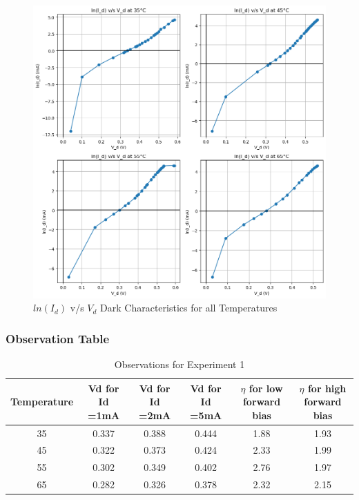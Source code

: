 \documentclass[a4paper]{article}
\begin{document}
\newpage

\begin{figure}[h!]
    \centering
    \includegraphics[width=1\linewidth]{Lab_5/Post_Lab/ln_I_d_vs_V_d_Exp_1_Summarised.png}
    \caption{$ln(I_d)$ v/s $V_d$ Dark Characteristics for all Temperatures}
\end{figure}

\subsubsection{Observation Table}
\begin{table}[!h]
    \centering
    \begin{tabular}{|c|c|c|c|c|c|}
        \hline
        \textbf{Temperature} & Vd for Id =1mA & Vd for Id =2mA & Vd for Id =5mA & $\eta$ for low forward bias & $\eta$ for high forward bias \\ \hline
        35 & 0.337 & 0.388 & 0.444 & 1.88 & 1.93 \\ \hline
        45 & 0.322 & 0.373 & 0.424 & 2.33 & 1.99 \\ \hline
        55 & 0.302 & 0.349 & 0.402 & 2.76 & 1.97 \\ \hline
        65 & 0.282 & 0.326 & 0.378 & 2.32 & 2.15 \\ \hline
    \end{tabular}
    \caption{Observations for Experiment 1}
    \label{tab:experiment_1}
\end{table}
\end{document}
